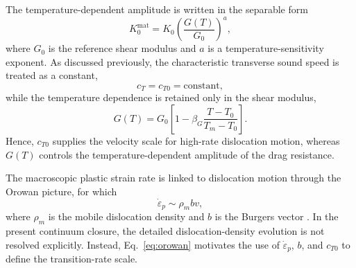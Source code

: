 The temperature-dependent amplitude is written in the separable form
\begin{equation}
K_0^{\mathrm{mat}} = K_0\left(\frac{G(T)}{G_0}\right)^a,
\label{eq:k0_materialized}
\end{equation}
where $G_0$ is the reference shear modulus and $a$ is a temperature-sensitivity exponent. As discussed previously, the characteristic transverse sound speed is treated as a constant,
\begin{equation}
c_T = c_{T0} = \text{constant},
\label{eq:ct_constant}
\end{equation}
while the temperature dependence is retained only in the shear modulus,
\begin{equation}
G(T)=G_0\left[1-\beta_G\frac{T-T_0}{T_m-T_0}\right].
\label{eq:G_of_T}
\end{equation}
Hence, $c_{T0}$ supplies the velocity scale for high-rate dislocation motion, whereas $G(T)$ controls the temperature-dependent amplitude of the drag resistance.

The macroscopic plastic strain rate is linked to dislocation motion through the Orowan picture, for which
\begin{equation}
\dot{\varepsilon}_p \sim \rho_m b v,
\label{eq:orowan}
\end{equation}
where $\rho_m$ is the mobile dislocation density and $b$ is the Burgers vector \cite{Orowan1940}. In the present continuum closure, the detailed dislocation-density evolution is not resolved explicitly. Instead, Eq.~\eqref{eq:orowan} motivates the use of $\dot{\varepsilon}_p$, $b$, and $c_{T0}$ to define the transition-rate scale.

